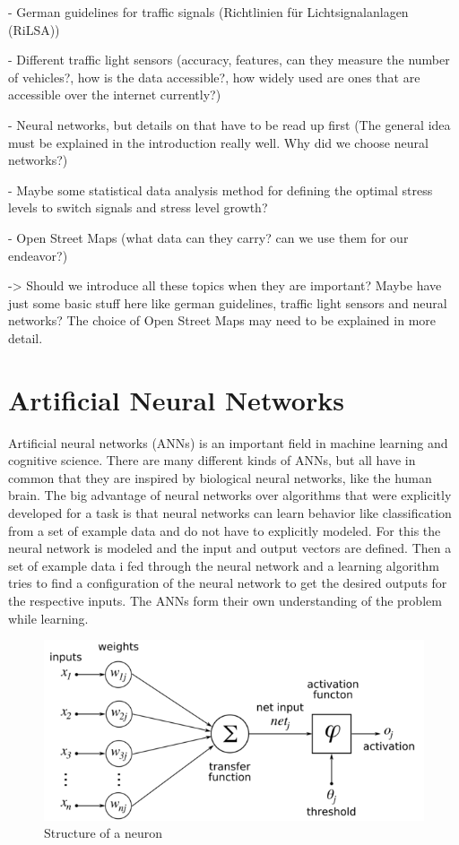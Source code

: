- German guidelines for traffic signals (Richtlinien für Lichtsignalanlagen (RiLSA))

- Different traffic light sensors (accuracy, features, can they measure the number of vehicles?, how is the data accessible?, how widely used are ones that are accessible over the internet currently?)

- Neural networks, but details on that have to be read up first (The general idea must be explained in the introduction really well. Why did we choose neural networks?)

- Maybe some statistical data analysis method for defining the optimal stress levels to switch signals and stress level growth?

- Open Street Maps (what data can they carry? can we use them for our endeavor?)

-> Should we introduce all these topics when they are important? Maybe have just some basic stuff here like german guidelines, traffic light sensors and neural networks? The choice of Open Street Maps may need to be explained in more detail.

\newpage

\section{Artificial Neural Networks}

Artificial neural networks (ANNs) is an important field in machine learning and cognitive science. There are many different kinds of ANNs, but all have in common that they are inspired by biological neural networks, like the human brain. The big advantage of neural networks over algorithms that were explicitly developed for a task is that neural networks can learn behavior like classification from a set of example data and do not have to explicitly modeled. For this the neural network is modeled and the input and output vectors are defined. Then a set of example data i fed through the neural network and a learning algorithm tries to find a configuration of the neural network to get the desired outputs for the respective inputs. The ANNs form their own understanding of the problem while learning.

\begin{figure}[ht]
	\centering
  \includegraphics[scale=0.65]{figures/neuron_structure.png}
	\caption[Structure of a neuron]{Structure of a neuron \protect\footnotemark}
	\label{neuron}
\end{figure}

